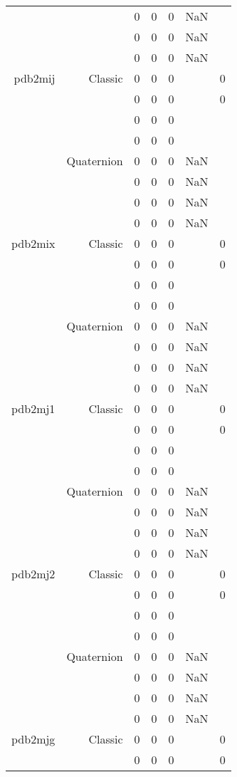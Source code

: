 \begin{xltabular}{\textwidth}{r|rcccSc}
& & 0 & 0 & 0 & NaN & \\
& & 0 & 0 & 0 & NaN & \\
& & 0 & 0 & 0 & NaN & \\ \addlinespace
pdb2mij & Classic & 0 & 0 & 0 & & 0 \\
& & 0 & 0 & 0 & & 0 \\
& & 0 & 0 & 0 & & \\
& & 0 & 0 & 0 & & \\
& Quaternion & 0 & 0 & 0 & NaN & \\
& & 0 & 0 & 0 & NaN & \\
& & 0 & 0 & 0 & NaN & \\
& & 0 & 0 & 0 & NaN & \\ \addlinespace
pdb2mix & Classic & 0 & 0 & 0 & & 0 \\
& & 0 & 0 & 0 & & 0 \\
& & 0 & 0 & 0 & & \\
& & 0 & 0 & 0 & & \\
& Quaternion & 0 & 0 & 0 & NaN & \\
& & 0 & 0 & 0 & NaN & \\
& & 0 & 0 & 0 & NaN & \\
& & 0 & 0 & 0 & NaN & \\ \addlinespace
pdb2mj1 & Classic & 0 & 0 & 0 & & 0 \\
& & 0 & 0 & 0 & & 0 \\
& & 0 & 0 & 0 & & \\
& & 0 & 0 & 0 & & \\
& Quaternion & 0 & 0 & 0 & NaN & \\
& & 0 & 0 & 0 & NaN & \\
& & 0 & 0 & 0 & NaN & \\
& & 0 & 0 & 0 & NaN & \\ \addlinespace
pdb2mj2 & Classic & 0 & 0 & 0 & & 0 \\
& & 0 & 0 & 0 & & 0 \\
& & 0 & 0 & 0 & & \\
& & 0 & 0 & 0 & & \\
& Quaternion & 0 & 0 & 0 & NaN & \\
& & 0 & 0 & 0 & NaN & \\
& & 0 & 0 & 0 & NaN & \\
& & 0 & 0 & 0 & NaN & \\ \addlinespace
pdb2mjg & Classic & 0 & 0 & 0 & & 0 \\
& & 0 & 0 & 0 & & 0 \\

\end{xltabular}
